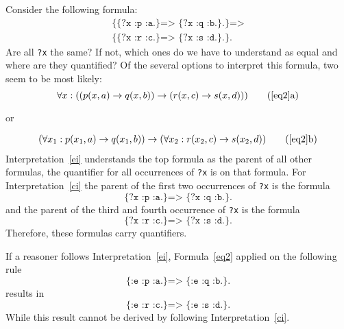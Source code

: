 Consider the following formula:
\begin{multline}
\texttt{\{\{?x :p :a.\} => \{?x :q :b.\}.\} =>}\\
\texttt{\{\{?x :r :c.\} => \{?x :s :d.\}.\}.} \label{eq2} \end{multline}
Are all \verb!?x! the same? If not, which ones do we have to understand as equal and where are they quantified? 
Of the several options to interpret this formula, two seem to be most likely:
\[\forall x: ((p(x,a)\rightarrow q(x,b))\rightarrow ( r(x,c) \rightarrow s(x,d)))\tag{\ref{eq2}a}\label{ei}\]
\begin{center}or\end{center}
\vspace{-\baselineskip}
\begin{multline}
(\forall x_1: p(x_1,a)\rightarrow q(x_1,b))\rightarrow (\forall x_2: r(x_2,c) \rightarrow s(x_2,d))\tag{\ref{eq2}b}\label{ci}
\end{multline}
Interpretation~\ref{ei} understands the top formula as the parent of all other formulas, the quantifier for all occurrences of \texttt{?x} is on that formula.
For Interpretation~\ref{ci} the parent of the first two occurrences of \texttt{?x} is the formula 
\begin{equation}
\texttt{\{?x :p :a.\} => \{?x :q :b.\}.}\label{sub1}
\end{equation}
and the parent of the third and fourth occurrence of \texttt{?x} is the formula
\begin{equation}\texttt{\{?x :r :c.\} => \{?x :s :d.\}.}\label{sub2}\end{equation}
Therefore, these formulas carry quantifiers.

If a reasoner follows Interpretation~\ref{ei}, Formula~\ref{eq2} applied on the following rule
\begin{equation}\label{ss1}
 \texttt{\{:e :p :a.\} => \{:e :q :b.\}.}
\end{equation}
results in
\begin{equation}\texttt{\{:e :r :c.\} => \{:e :s :d.\}.}\label{ss2}\end{equation}
While this result cannot be derived by following Interpretation~\ref{ci}. %


